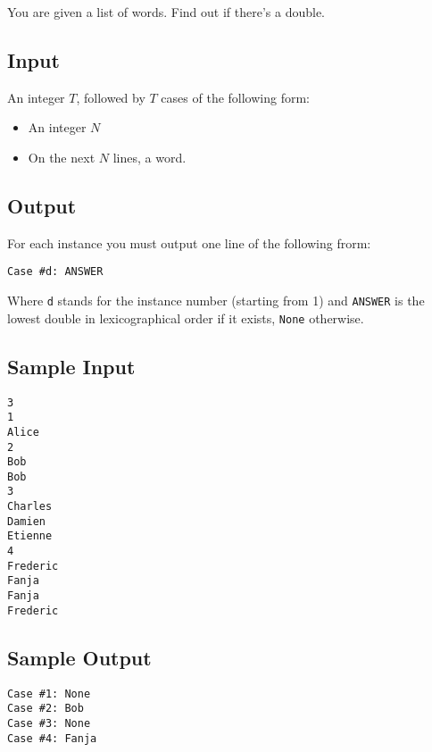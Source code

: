 

You are given a list of words. Find out if there's a double.

\subsection*{Input}

An integer $T$, followed by $T$ cases of the following form:
\begin{itemize}
\item An integer $N$
\item On the next $N$ lines, a word.
\end{itemize}

\subsection*{Output}

For each instance you must output one line of the following frorm:

\begin{verbatim}
Case #d: ANSWER
\end{verbatim}

Where \texttt{d} stands for the instance number (starting from 1) and \texttt{ANSWER} is the lowest double in lexicographical order if it exists, \texttt{None} otherwise.

\subsection*{Sample Input}

\begin{verbatim}
3
1
Alice
2
Bob
Bob
3
Charles
Damien
Etienne
4
Frederic
Fanja
Fanja
Frederic
\end{verbatim}

\subsection*{Sample Output}

\begin{verbatim}
Case #1: None
Case #2: Bob
Case #3: None
Case #4: Fanja
\end{verbatim}
